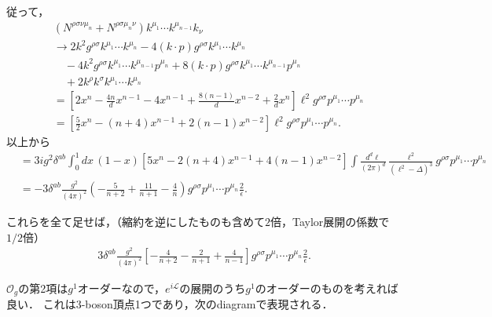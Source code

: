 従って，
\begin{align*}
  & (N^{\rho\sigma\nu\mu_n} + N^{\rho\sigma\mu_n\nu}) k^{\mu_1} \cdots k^{\mu_{n-1}} k_\nu \\
  &\to 2k^2 g^{\rho\sigma} k^{\mu_1} \cdots k^{\mu_n} - 4(k\cdot p) g^{\rho\sigma} k^{\mu_1} \cdots k^{\mu_n} \\
  &\quad - 4k^2 g^{\rho\sigma} k^{\mu_1} \cdots k^{\mu_{n-1}} p^{\mu_n} + 8(k\cdot p) g^{\rho\sigma} k^{\mu_1} \cdots k^{\mu_{n-1}} p^{\mu_n} \\
  &\quad + 2k^\rho k^\sigma k^{\mu_1} \cdots k^{\mu_n} \\
  &= \left[ 2x^n - \frac{4n}{d}x^{n-1} - 4x^{n-1} + \frac{8(n-1)}{d}x^{n-2} + \frac{2}{d}x^n \right] \ell^2 g^{\rho\sigma} p^{\mu_1} \cdots p^{\mu_n} \\
  &= \left[ \frac{5}{2}x^n - (n+4)x^{n-1} + 2(n-1)x^{n-2} \right] \ell^2 g^{\rho\sigma} p^{\mu_1} \cdots p^{\mu_n} .
\end{align*}
以上から
\begin{align*}
  &= 3 ig^2 \delta^{ab} \int_0^1 dx\, (1-x) [5x^n - 2(n+4)x^{n-1} + 4(n-1)x^{n-2}] \int \frac{d^d\ell}{(2\pi)^d}
  \frac{\ell^2}{(\ell^2-\Delta)^3} g^{\rho\sigma} p^{\mu_1} \cdots p^{\mu_n} \\
  &= -3 \delta^{ab} \frac{g^2}{(4\pi)^2} \left( -\frac{5}{n+2} + \frac{11}{n+1} - \frac{4}{n} \right) g^{\rho\sigma} p^{\mu_1} \cdots p^{\mu_n} \frac{2}{\epsilon} .
\end{align*}

これらを全て足せば，（縮約を逆にしたものも含めて$2$倍，Taylor展開の係数で$1/2$倍）
\begin{align}
    3 \delta^{ab}\frac{g^2}{(4\pi)^2} \left[ - \frac{4}{n+2} - \frac{2}{n+1} + \frac{4}{n-1} \right]
    g^{\rho\sigma} p^{\mu_1} \cdots p^{\mu_n} \frac{2}{\epsilon} .
    \label{problem_18_3_a_gg_AAOg}
\end{align}

$\mathcal{O}_g$の第2項は$g^1$オーダーなので，$e^{i\mathcal{L}}$の展開のうち$g^1$のオーダーのものを考えれば良い．
これは3-boson頂点1つであり，次のdiagramで表現される．

